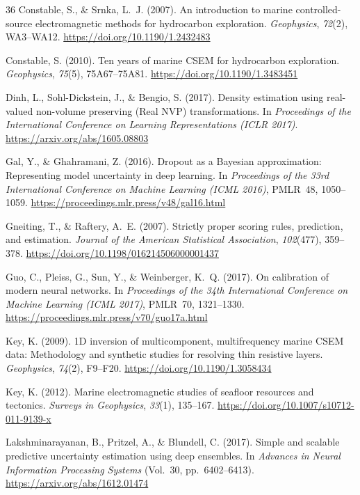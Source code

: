 \documentclass[journal]{IEEEtran}
\begin{document}
\begin{thebibliography}{36}
Constable, S., \& Srnka, L.~J. (2007).
An introduction to marine controlled-source electromagnetic methods
for hydrocarbon exploration.
\textit{Geophysics}, \textit{72}(2), WA3--WA12.
\url{https://doi.org/10.1190/1.2432483}

Constable, S. (2010).
Ten years of marine CSEM for hydrocarbon exploration.
\textit{Geophysics}, \textit{75}(5), 75A67--75A81.
\url{https://doi.org/10.1190/1.3483451}

Dinh, L., Sohl-Dickstein, J., \& Bengio, S. (2017).
Density estimation using real-valued non-volume preserving (Real NVP)
transformations.
In \textit{Proceedings of the International Conference on Learning
Representations (ICLR 2017)}.
\url{https://arxiv.org/abs/1605.08803}

Gal, Y., \& Ghahramani, Z. (2016).
Dropout as a Bayesian approximation: Representing model uncertainty
in deep learning.
In \textit{Proceedings of the 33rd International Conference on
Machine Learning (ICML 2016)}, PMLR~48, 1050--1059.
\url{https://proceedings.mlr.press/v48/gal16.html}

Gneiting, T., \& Raftery, A.~E. (2007).
Strictly proper scoring rules, prediction, and estimation.
\textit{Journal of the American Statistical Association},
\textit{102}(477), 359--378.
\url{https://doi.org/10.1198/016214506000001437}

Guo, C., Pleiss, G., Sun, Y., \& Weinberger, K.~Q. (2017).
On calibration of modern neural networks.
In \textit{Proceedings of the 34th International Conference on
Machine Learning (ICML 2017)}, PMLR~70, 1321--1330.
\url{https://proceedings.mlr.press/v70/guo17a.html}

Key, K. (2009).
1D inversion of multicomponent, multifrequency marine CSEM data:
Methodology and synthetic studies for resolving thin resistive layers.
\textit{Geophysics}, \textit{74}(2), F9--F20.
\url{https://doi.org/10.1190/1.3058434}

Key, K. (2012).
Marine electromagnetic studies of seafloor resources and tectonics.
\textit{Surveys in Geophysics}, \textit{33}(1), 135--167.
\url{https://doi.org/10.1007/s10712-011-9139-x}

Lakshminarayanan, B., Pritzel, A., \& Blundell, C. (2017).
Simple and scalable predictive uncertainty estimation using deep
ensembles.
In \textit{Advances in Neural Information Processing Systems}
(Vol.~30, pp.~6402--6413).
\url{https://arxiv.org/abs/1612.01474}


\end{thebibliography}
\end{document}
